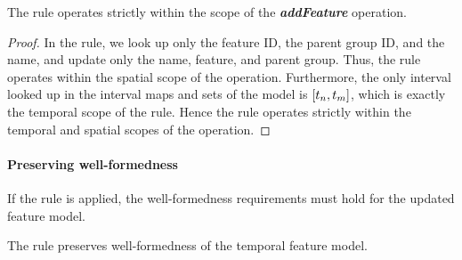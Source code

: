\begin{lemma}
   The \emph{} rule operates strictly within the scope of the \emph{\textbf{addFeature}} operation.
\end{lemma}

\begin{proof}
In the rule, we look up only the feature ID, the parent group ID, and the name, and update only the name, feature, and parent group. Thus, the rule operates within the spatial scope of the operation. Furthermore, the only interval looked up in the interval maps and sets of the model is $\interval{t_n}{t_m}$, which is exactly the temporal scope of the rule. Hence the rule operates strictly within the temporal and spatial scopes of the operation.
\end{proof}

\paragraph{Preserving well-formedness}

If the rule is applied, the well-formedness requirements must hold for the updated feature model. 
\\

\begin{lemma}
   The \emph{} rule preserves well-formedness of the temporal feature model.
\end{lemma}


